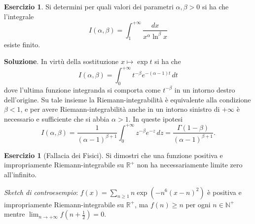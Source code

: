 \documentclass[a4paper,twoside]{article}
\newcommand{\N}{\mathbb{N}}
\newcommand{\R}{\mathbb{R}}
\theoremstyle{definition}
\newtheorem{ex}[theorem]{Esercizio}
\numberwithin{theorem}{section}
\begin{document}
\begin{ex} Si determini per quali valori dei parametri $\alpha,\beta > 0$ si ha che l'integrale 
$$ I(\alpha,\beta) = \int_{1}^{+\infty}\frac{dx}{x^\alpha \ln^\beta x}$$
esiste finito. 
\end{ex}
\textbf{Soluzione}. In virtù della sostituzione $x\mapsto\exp t$ si ha che 
$$ I(\alpha,\beta) = \int_{0}^{+\infty}t^{-\beta} e^{-(\alpha-1)t}\,dt $$
dove l'ultima funzione integranda si comporta come $t^{-\beta}$ in un intorno destro dell'origine. Su tale insieme la Riemann-integrabilità è equivalente alla condizione $\beta < 1$, e per avere Riemann-integrabilità anche in un intorno sinistro di $+\infty$ è necessario e sufficiente che si abbia $\alpha>1$. In queste ipotesi 
$$ I(\alpha,\beta) = \frac{1}{(\alpha-1)^{\beta+1}}\int_{0}^{+\infty} z^{-\beta} e^{-z}\,dz = \frac{\Gamma(1-\beta)}{(\alpha-1)^{\beta+1}}.$$

\begin{ex}[Fallacia dei Fisici] Si dimostri che una funzione positiva e impropriamente Riemann-integrabile su $\R^+$ non ha necessariamente limite zero all'infinito. 
\end{ex}
\emph{Sketch di controesempio}: $f(x) = \sum_{n\geq 1} n\exp\left(-n^6(x-n)^2\right)$ è positiva e impropriamente Riemann-integrabile su $\R^+$, ma $f(n)\geq n$ per ogni $n\in\N^+$ mentre $\lim_{n\to +\infty} f\left(n+\frac{1}{2}\right)=0$.
\end{document}
